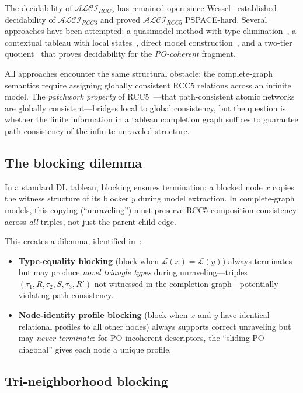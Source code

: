 \documentclass[a4paper,11pt]{article}
\theoremstyle{definition}
\newcommand{\ALCI}{\ensuremath{\mathcal{ALCI}}}
\newcommand{\ALCIRCC}[1]{\ensuremath{\mathcal{ALCI}_{\mathit{RCC#1}}}}
\newcommand{\LL}{\ensuremath{\mathcal{L}}}
\begin{document}
The decidability of $\ALCIRCC{5}$ has remained open since
Wessel~\cite{Wessel2002} established decidability of
$\ALCI_{\mathit{RCC3}}$ and proved $\ALCIRCC{5}$ PSPACE-hard.
Several approaches have been attempted: a quasimodel method
with type elimination~\cite{CompanionPaper}, a contextual
tableau with local states~\cite{GPTTableau}, direct model
construction~\cite{ClosingGap}, and a two-tier
quotient~\cite{TwoTier} that proves decidability for the
\emph{PO-coherent} fragment.

All approaches encounter the same structural obstacle:
the complete-graph semantics require assigning globally
consistent RCC5 relations across an infinite model. The
\emph{patchwork property} of RCC5~\cite{RenzNebel1999}---that
path-consistent atomic networks are globally consistent---bridges
local to global consistency, but the question is whether the
finite information in a tableau completion graph suffices to
guarantee path-consistency of the infinite unraveled structure.

\subsection*{The blocking dilemma}

In a standard DL tableau, blocking ensures termination:
a blocked node $x$ copies the witness structure of its blocker
$y$ during model extraction.  In complete-graph models, this
copying (``unraveling'') must preserve RCC5 composition
consistency across \emph{all} triples, not just the
parent-child edge.

This creates a dilemma, identified in~\cite{TwoTier}:
\begin{itemize}[nosep]
  \item \textbf{Type-equality blocking} (block when
    $\LL(x) = \LL(y)$) always terminates but may produce
    \emph{novel triangle types} during unraveling---triples
    $(\tau_1, R, \tau_2, S, \tau_3, R')$ not witnessed in
    the completion graph---potentially violating
    path-consistency.
  \item \textbf{Node-identity profile blocking} (block when
    $x$ and $y$ have identical relational profiles to all
    other nodes) always supports correct unraveling but may
    \emph{never terminate}: for PO-incoherent descriptors,
    the ``sliding PO diagonal'' gives each node a unique
    profile.
\end{itemize}

\subsection*{Tri-neighborhood blocking}
\end{document}
